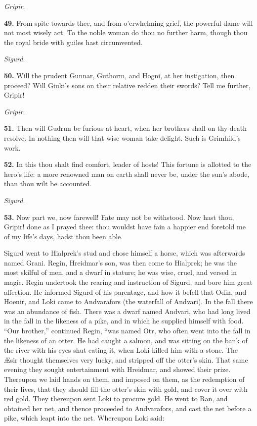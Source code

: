 \emph{Gripir}.

\textbf{49.} From spite towards thee, and from o'erwhelming grief, the
powerful dame will not most wisely act. To the noble woman do thou no
further harm, though thou the royal bride with guiles hast
circumvented.

\emph{Sigurd}.

\textbf{50.} Will the prudent Gunnar, Guthorm, and Hogni, at her instigation,
then proceed? Will Giuki's sons on their relative redden their swords?
Tell me further, Gripir!

\emph{Gripir}.

\textbf{51.} Then will Gudrun be furious at heart, when her brothers shall on
thy death resolve. In nothing then will that wise woman take delight.
Such is Grimhild's work.

\textbf{52.} In this thou shalt find comfort, leader of hosts! This fortune
is allotted to the hero's life: a more renowned man on earth shall
never be, under the sun's abode, than thou wilt be accounted.

\emph{Sigurd}.

\textbf{53.} Now part we, now farewell! Fate may not be withstood. Now hast
thou, Gripir! done as I prayed thee: thou wouldst have fain a happier
end foretold me of my life's days, hadst thou been able.


Sigurd went to Hialprek's stud and chose himself a horse, which was
afterwards named Grani. Regin, Hreidmar's son, was then come to
Hialprek; he was the most skilful of men, and a dwarf in stature; he
was wise, cruel, and versed in magic. Regin undertook the rearing and
instruction of Sigurd, and bore him great affection. He informed
Sigurd of his parentage, and how it befell that Odin, and Hoenir, and
Loki came to Andvarafors (the waterfall of Andvari). In the fall there
was an abundance of fish. There was a dwarf named Andvari, who had
long lived in the fall in the likeness of a pike, and in which he
supplied himself with food. ``Our brother,'' continued Regin, ``was named
Otr, who often went into the fall in the likeness of an otter. He had
caught a salmon, and was sitting on the bank of the river with his
eyes shut eating it, when Loki killed him with a stone. The Æsir
thought themselves very lucky, and stripped off the otter's skin. That
same evening they sought entertainment with Hreidmar, and showed their
prize. Thereupon we laid hands on them, and imposed on them, as the
redemption of their lives, that they should fill the otter's skin with
gold, and cover it over with red gold. They thereupon sent Loki to
procure gold. He went to Ran, and obtained her net, and thence
proceeded to Andvarafors, and cast the net before a pike, which leapt
into the net. Whereupon Loki said:

